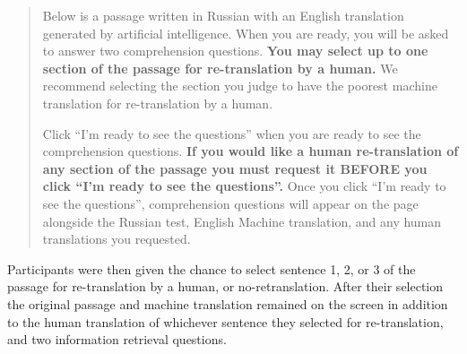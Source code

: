 \begin{quote}
Below is a passage written in Russian with an English translation generated by artificial intelligence. When you are ready, you will be asked to answer two comprehension questions. \textbf{You may select up to one section of the passage for re-translation by a human.} We recommend selecting the section you judge to have the poorest machine translation for re-translation by a human. 

Click ``I’m ready to see the questions'' when you are ready to see the comprehension questions. \textbf{If you would like a human re-translation of any section of the passage you must request it BEFORE you click ``I’m ready to see the questions''.} Once you click ``I’m ready to see the questions'', comprehension questions will appear on the page alongside the Russian test, English Machine translation, and any human translations you requested.  
\end{quote}

Participants were then given the chance to select sentence 1, 2, or 3 of the passage for re-translation by a human, or no-retranslation. After their selection the original passage and machine translation remained on the screen in addition to the human translation of whichever sentence they selected for re-translation, and two information retrieval questions. 

\begin{table}[]
\caption{N for each condition. }
\label{tab:exp_N}
\end{table}

